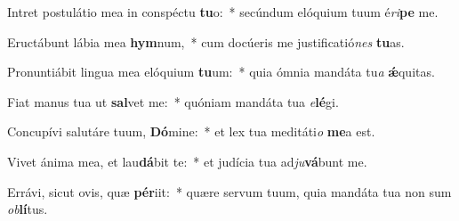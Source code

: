 \item Intret postulátio mea in conspéctu \textbf{tu}o:~* secúndum elóquium tuum é\textit{ri}\textbf{pe} me.
\item Eructábunt lábia mea \textbf{hym}num,~* cum docúeris me justificatió\textit{nes} \textbf{tu}as.
\item Pronuntiábit lingua mea elóquium \textbf{tu}um:~* quia ómnia mandáta tu\textit{a} \textbf{ǽ}quitas.
\item Fiat manus tua ut \textbf{sal}vet me:~* quóniam mandáta tua \textit{e}\textbf{lé}gi.
\item Concupívi salutáre tuum, \textbf{Dó}mine:~* et lex tua meditáti\textit{o} \textbf{me}a est.
\item Vivet ánima mea, et lau\textbf{dá}bit te:~* et judícia tua ad\textit{ju}\textbf{vá}bunt me.
\item Errávi, sicut ovis, quæ \textbf{pér}iit:~* quære servum tuum, quia mandáta tua non sum \textit{ob}\textbf{lí}tus.
